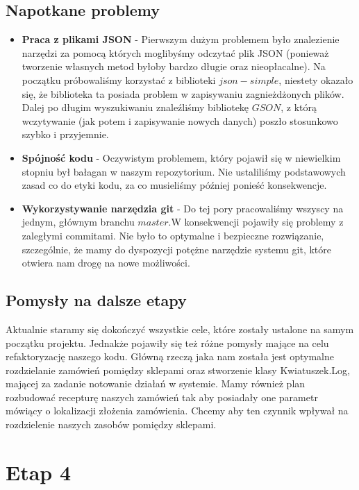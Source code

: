 \documentclass{article}
\begin{document}
        \subsection{Napotkane problemy}\begin{itemize}
            \item \textbf{Praca z plikami JSON} - Pierwszym dużym problemem było znalezienie narzędzi za pomocą których moglibyśmy odczytać plik JSON (ponieważ tworzenie własnych metod byłoby bardzo długie oraz nieopłacalne). Na początku próbowaliśmy korzystać z biblioteki $json-simple$, niestety okazało się, że biblioteka ta posiada problem w zapisywaniu zagnieżdżonych plików. Dalej po długim wyszukiwaniu znaleźliśmy bibliotekę $GSON$, z którą wczytywanie (jak potem i zapisywanie nowych danych) poszło stosunkowo szybko i przyjemnie. 
            \item \textbf{Spójność kodu} - Oczywistym problemem, który pojawił się w niewielkim stopniu był bałagan w naszym repozytorium. Nie ustaliliśmy podstawowych zasad co do etyki kodu, za co musieliśmy później ponieść konsekwencje.
            \item \textbf{Wykorzystywanie narzędzia git} - Do tej pory pracowaliśmy wszyscy na jednym, głównym branchu $master$.W konsekwencji pojawiły się problemy z zaległymi commitami. Nie było to optymalne i bezpieczne rozwiązanie, szczególnie, że mamy do dyspozycji potężne narzędzie systemu git, które otwiera nam drogę na nowe możliwości.
        \end{itemize}
        
        \subsection{Pomysły na dalsze etapy}
        Aktualnie staramy się dokończyć wszystkie cele, które zostały ustalone na samym początku projektu. Jednakże pojawiły się też różne pomysły mające na celu refaktoryzację naszego kodu. Główną rzeczą jaka nam została jest optymalne rozdzielanie zamówień pomiędzy sklepami oraz stworzenie klasy Kwiatuszek.Log, mającej za zadanie notowanie działań w systemie. Mamy również plan rozbudować recepturę naszych zamówień tak aby posiadały one parametr mówiący o lokalizacji złożenia zamówienia. Chcemy aby ten czynnik wpływał na rozdzielenie naszych zasobów pomiędzy sklepami.
    
    \section{Etap 4}
\end{document}
